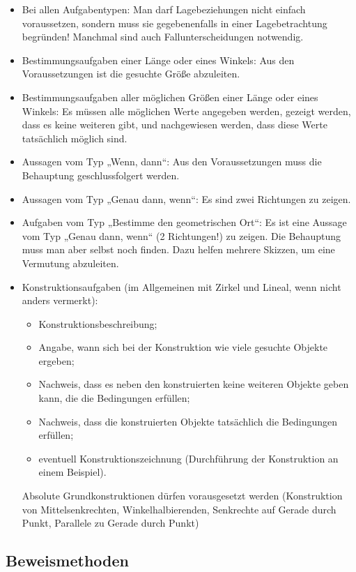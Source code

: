 \documentclass[11pt,a4paper]{article}
\begin{document}
\begin{itemize}
\item Bei allen Aufgabentypen: Man darf Lagebeziehungen nicht einfach
  voraussetzen, sondern muss sie gegebenenfalls in einer Lagebetrachtung
  begründen! Manchmal sind auch Fallunterscheidungen notwendig.
\item Bestimmungsaufgaben einer Länge oder eines Winkels: Aus den
  Voraussetzungen ist die gesuchte Größe abzuleiten.
\item Bestimmungsaufgaben aller möglichen Größen einer Länge oder eines
  Winkels: Es müssen alle möglichen Werte angegeben werden, gezeigt werden,
  dass es keine weiteren gibt, und nachgewiesen werden, dass diese Werte
  tatsächlich möglich sind.
\item Aussagen vom Typ „Wenn, dann“: Aus den Voraussetzungen muss die
  Behauptung geschlussfolgert werden.
\item Aussagen vom Typ „Genau dann, wenn“: Es sind zwei Richtungen zu zeigen.
\item Aufgaben vom Typ „Bestimme den geometrischen Ort“: Es ist eine Aussage
  vom Typ „Genau dann, wenn“ (2 Richtungen!) zu zeigen. Die Behauptung muss
  man aber selbst noch finden. Dazu helfen mehrere Skizzen, um eine Vermutung
  abzuleiten.
\item Konstruktionsaufgaben (im Allgemeinen mit Zirkel und Lineal, wenn nicht
  anders vermerkt):
\begin{itemize}
\item Konstruktionsbeschreibung;
\item Angabe, wann sich bei der Konstruktion wie viele gesuchte Objekte
  ergeben;
\item Nachweis, dass es neben den konstruierten keine weiteren Objekte geben
  kann, die die Bedingungen erfüllen;
\item Nachweis, dass die konstruierten Objekte tatsächlich die Bedingungen
  erfüllen;
\item eventuell Konstruktionszeichnung (Durchführung der Konstruktion an einem
  Beispiel).
\end{itemize}
Absolute Grundkonstruktionen dürfen vorausgesetzt werden (Konstruktion von
Mittelsenkrechten, Winkelhalbierenden, Senkrechte auf Gerade durch Punkt,
Parallele zu Gerade durch Punkt)
\end{itemize}

\subsection{Beweismethoden}
\end{document}

